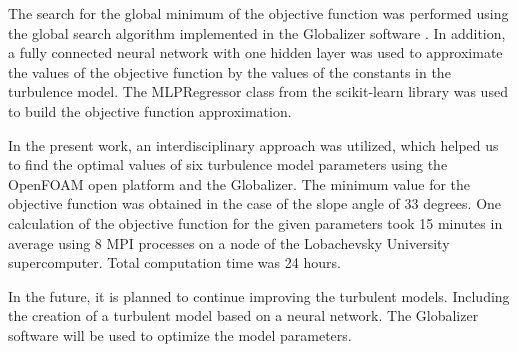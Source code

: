 \documentclass[mathematics,article,submit,pdftex,moreauthors]{Definitions/mdpi}
\begin{document}
The search for the global minimum of the objective function was performed using the global search algorithm implemented in the Globalizer software \cite{globalizerSystem}. In addition, a fully connected neural network with one hidden layer was used to approximate the values of the objective function by the values of the constants in the turbulence model. The MLPRegressor class from the scikit-learn library was used to build the objective function approximation. 

In the present work, an interdisciplinary approach was utilized, which helped us to find the optimal values of six turbulence model parameters using the OpenFOAM open platform and the Globalizer. The minimum value for the objective function was obtained in the case of the slope angle of 33 degrees. One calculation of the objective function for the given parameters took 15 minutes in average using 8 MPI processes on a node of the Lobachevsky University supercomputer. Total computation time was 24 hours.  

In the future, it is planned to continue improving the turbulent models. Including the creation of a turbulent model based on a neural network. The Globalizer software will be used to optimize the model parameters.

\vspace{6pt} 



\end{document}
